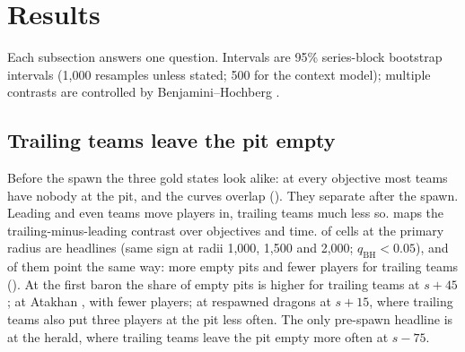\section{Results}
\label{sec:results}

Each subsection answers one question. Intervals are 95\% series-block bootstrap intervals (1,000 resamples unless stated; 500 for the context model); multiple contrasts are controlled by Benjamini--Hochberg \citep{benjamini1995controlling}.

\subsection{Trailing teams leave the pit empty}
\label{sec:empty}


Before the spawn the three gold states look alike: at every objective most teams have nobody at the pit, and the curves overlap ().
They separate after the spawn.
Leading and even teams move players in, trailing teams much less so.
 maps the trailing-minus-leading contrast over objectives and time.
 of  cells at the primary radius are headlines (same sign at radii 1,000, 1,500 and 2,000; $q_{\mathrm{BH}}<0.05$), and  of them point the same way: more empty pits and fewer players for trailing teams ().
At the first baron the share of empty pits is \pp{}  higher for trailing teams at $s{+}45$; at Atakhan \pp{} , with   fewer players; at respawned dragons \pp{}  at $s{+}15$, where trailing teams also put three players at the pit \pp{}  less often.
The only pre-spawn headline is at the herald, where trailing teams leave the pit empty \pp{}  more often at $s{-}75$.



